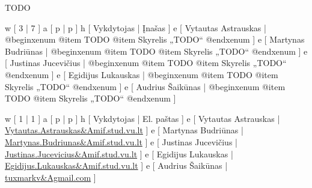 
TODO

\xtable
{
  w [ 3  | 7 ]
  a [ p  | p ]
  h [ Vykdytojas | Įnašas ]
  e [ Vytautas Astrauskas
  | @begin{xenum} 
      @item TODO
      @item Skyrelis „TODO“
    @end{xenum}
  ]
  e [ Martynas Budriūnas
  | @begin{xenum} 
      @item TODO
      @item Skyrelis „TODO“
    @end{xenum}
  ]
  e [ Justinas Jucevičius 
  | @begin{xenum} 
      @item TODO
      @item Skyrelis „TODO“
    @end{xenum}
  ]
  e [ Egidijus Lukauskas 
  | @begin{xenum} 
      @item TODO
      @item Skyrelis „TODO“
    @end{xenum}
  ]
  e [ Audrius Šaikūnas 
  | @begin{xenum} 
      @item TODO
      @item Skyrelis „TODO“
    @end{xenum}
  ]
}

\xtableu
{
  w [ 1 | 1 ]
  a [ p | p ]
  h [ Vykdytojas | El. paštas ]
  e [ Vytautas Astrauskas | \url{Vytautas.Astrauskas&Amif.stud.vu.lt} ]
  e [ Martynas Budriūnas  | \url{Martynas.Budriunas&Amif.stud.vu.lt} ]
  e [ Justinas Jucevičius | \url{Justinas.Jucevicius&Amif.stud.vu.lt} ]
  e [ Egidijus Lukauskas  | \url{Egidijus.Lukauskas&Amif.stud.vu.lt} ]
  e [ Audrius Šaikūnas    | \url{tuxmarkv&Agmail.com} ]
}
